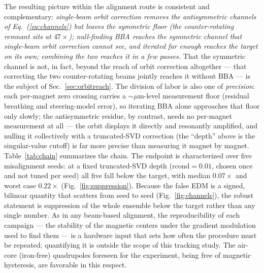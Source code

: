 \documentclass[aps,prab,reprint,superscriptaddress,nofootinbib]{revtex4-2}
\begin{document}
The resulting picture within the alignment route is consistent and
complementary: \emph{single-beam orbit
correction removes the antisymmetric channels of Eq.~(\ref{eq:channels}) but
leaves the symmetric floor (the counter-rotating remnant sits at $47\times$);
null-finding BBA reaches the symmetric channel that single-beam orbit correction
cannot see, and iterated far enough reaches the target on its own; combining the
two reaches it in a few passes.}  That the symmetric channel is not, in fact,
beyond the reach of orbit correction altogether --- that correcting the two
counter-rotating beams jointly reaches it without BBA --- is the subject of
Sec.~\ref{sec:orbitreach}.  The division of labor is also one of \emph{precision}: each
per-magnet zero crossing carries a $\sim\!\mu$m-level measurement floor
(residual breathing and steering-model error), so iterating BBA alone
approaches that floor only slowly; the antisymmetric residue, by contrast,
needs no per-magnet measurement at all --- the orbit displays it directly and
resonantly amplified, and nulling it collectively with a truncated-SVD
correction (the ``depth'' above is the singular-value cutoff) is far more
precise than measuring it magnet by magnet.  Table~\ref{tab:chain}
summarizes the chain.  The endpoint is characterized over five misalignment
seeds: at a fixed truncated-SVD depth ($\mathrm{rcond}=0.01$, chosen once and
not tuned per seed) all five fall below the target, with median $0.07\times$
and worst case $0.22\times$ (Fig.~\ref{fig:suppression}).  Because the false
EDM is a signed, bilinear quantity that scatters from seed to seed
(Fig.~\ref{fig:channels}), the robust statement is suppression of the whole
ensemble below the target rather than any single number.  As in any
beam-based alignment, the reproducibility
of each campaign --- the stability of the magnetic centers under the gradient
modulation used to find them --- is a hardware input that sets how often the
procedure must be repeated; quantifying it is outside the scope of this
tracking study.  The air-core (iron-free) quadrupoles foreseen for the
experiment, being free of magnetic hysteresis, are favorable in this respect.
\end{document}

